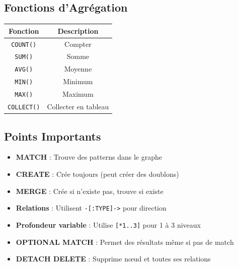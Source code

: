 \documentclass[11pt,a4paper]{article}
\begin{document}
\subsection{Fonctions d'Agrégation}

\begin{table}[h]
\centering
\begin{tabular}{|c|c|}
\hline
\textbf{Fonction} & \textbf{Description} \\
\hline
\texttt{COUNT()} & Compter \\
\hline
\texttt{SUM()} & Somme \\
\hline
\texttt{AVG()} & Moyenne \\
\hline
\texttt{MIN()} & Minimum \\
\hline
\texttt{MAX()} & Maximum \\
\hline
\texttt{COLLECT()} & Collecter en tableau \\
\hline
\end{tabular}
\end{table}

\subsection{Points Importants}

\begin{itemize}
    \item \textbf{MATCH} : Trouve des patterns dans le graphe
    \item \textbf{CREATE} : Crée toujours (peut créer des doublons)
    \item \textbf{MERGE} : Crée si n'existe pas, trouve si existe
    \item \textbf{Relations} : Utilisent \texttt{-[:TYPE]->} pour direction
    \item \textbf{Profondeur variable} : Utilise \texttt{[*1..3]} pour 1 à 3 niveaux
    \item \textbf{OPTIONAL MATCH} : Permet des résultats même si pas de match
    \item \textbf{DETACH DELETE} : Supprime nœud et toutes ses relations
\end{itemize}
\end{document}
